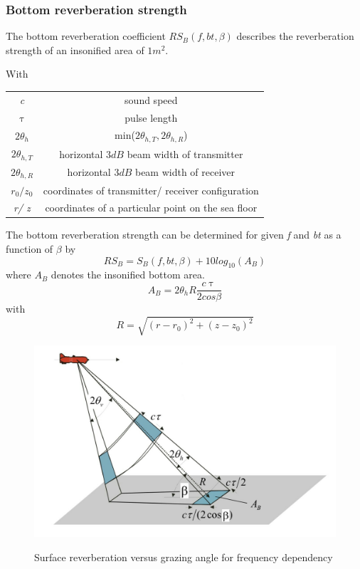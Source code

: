 \subsubsection{ Bottom reverberation strength } \label{ Bottom reverberation strength }
\noindent The bottom reverberation coefficient \textit{$RS_{B}(f,bt,\beta)$} describes the reverberation strength of an insonified area of $1 m^2.$

\noindent With 
\begin{center}
\begin{tabular}{ |c|c| } 
 \hline
  \textit{c} & sound speed  \\ 
  $\uptau$ & pulse length \\ 
  $2 \theta_{h}$  & min($2\theta_{h,T}, 2\theta_{h,R}$)  \\ 
  $2\theta_{h,T}$ &  horizontal $3 dB$ beam width of transmitter \\
  $2\theta_{h,R}$  & horizontal $3 dB$ beam width of receiver \\ 
  \textit{$r_0/ z_0$} & coordinates of transmitter/ receiver configuration \\
  \textit{r/ z} & coordinates of a particular point on the sea floor\\
  \hline
\end{tabular}
\end{center}

\noindent The bottom reverberation strength can be determined for given \textit{f} and \textit{bt} as a function of $\beta$ by
\begin{equation}
\textit{$RS_B$} = \textit{$S_{B}(f,bt,\beta)$} + 10 log_{10}{(A_B)}
\end{equation}
\noindent where \textit{$A_B$} denotes the insonified bottom area.
\begin{equation}
\textit{$A_B$} = 2 \theta_{h} R \frac{ c \uptau }{ 2 cos{\beta}}
\end{equation}
\noindent with
\begin{equation}
\textit{R} = \sqrt{ (\textit{r} - \textit{$r_{0}$})^{2} + (\textit{z} - \textit{$z_{0}$})^{2} }
\end{equation}

\begin{figure}[H]
\centering
{\includegraphics[scale=0.16]{theory1.jpg}}
\caption{Surface reverberation versus grazing angle for frequency dependency}
\end{figure}


